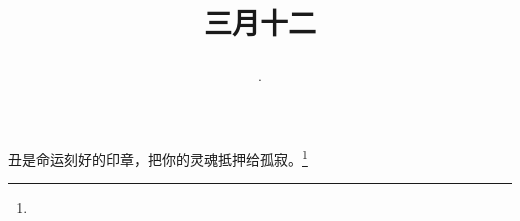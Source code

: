 \title{\date[d=20,m=4,y=2024][year:cn-y,年,month:cn,day:cn,日,·,weekday]·三月十二 }
丑是命运刻好的印章，把你的灵魂抵押给孤寂。\footnote{ }


